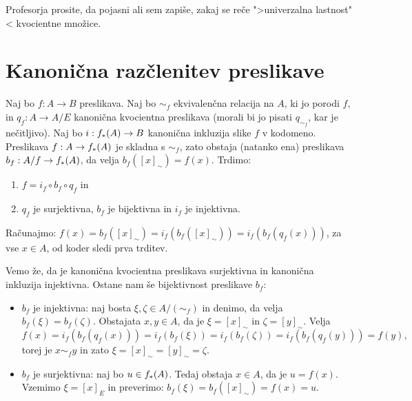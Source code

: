 \begin{opomba}
  Profesorja prosite, da pojasni ali sem zapiše, zakaj se reče ">univerzalna lastnost"< kvocientne množice.
\end{opomba}


\section{Kanonična razčlenitev preslikave}

Naj bo $f : A \to B$ preslikava. Naj bo $\sim_f$ ekvivalenčna relacija na $A$, ki jo porodi
$f$, in $q_f : A \to A/E$ kanonična kvocientna preslikava (morali bi jo pisati $q_{\sim_f}$,
kar je nečitljivo). Naj bo $i : f_{*}(A) \to B$ kanonična inkluzija slike $f$ v kodomeno.
Preslikava $f : A \to f_{*}(A)$ je skladna s $\sim_f$, zato obstaja (natanko ena) preslikava
$b_f : A/f \to f_{*}(A)$, da velja $b_f([x]_\sim) = f(x)$. Trdimo:
%
\begin{enumerate}
\item $f = i_f \circ b_f \circ q_f$ in
\item $q_f$ je surjektivna, $b_f$ je bijektivna in $i_f$ je injektivna.
\end{enumerate}
%
Računajmo: $f(x) = b_f([x]_\sim) = i_f(b_f([x]_\sim)) = i_f(b_f(q_f(x)))$, za vse $x \in A$, od
koder sledi prva trditev.

Vemo že, da je kanonična kvocientna preslikava surjektivna in kanonična inkluzija
injektivna. Ostane nam še bijektivnost preslikave $b_f$:
%
\begin{itemize}
\item $b_f$ je injektivna: naj bosta $\xi, \zeta \in A/(\sim_f)$ in denimo, da velja $b_f(\xi) = b_f(\zeta)$.
  Obstajata $x, y \in A$, da je $\xi = [x]_\sim$ in $\zeta = [y]_\sim$. Velja
  \begin{equation*}
    f(x) = i_f(b_f(q_f(x))) = i_f(b_f(\xi)) = i_f(b_f(\zeta)) = i_f(b_f(q_f(y))) = f(y),
  \end{equation*}
  torej je $x \sim_f y$ in zato $\xi = [x]_\sim = [y]_\sim = \zeta$.

  \item $b_f$ je surjektivna: naj bo $u \in f_{*}(A)$. Tedaj obstaja $x \in A$, da je $u = f(x)$.
  Vzemimo $\xi = [x]_E$ in preverimo: $b_f(\xi) = b_f([x]_\sim) =f(x) = u$.
\end{itemize}
